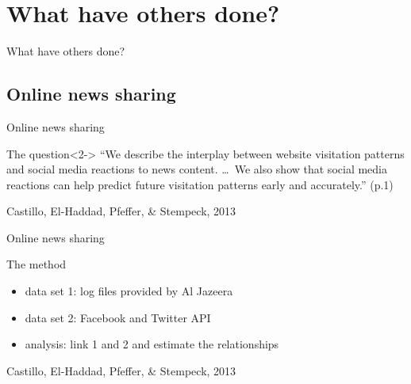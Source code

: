 \documentclass{beamer}
\begin{document}
\section{What have others done?}
\begin{frame}
What have others done?
\end{frame}

\subsection{Online news sharing}
\begin{frame}{Online news sharing}
\begin{block}{The question}<2->
``We describe the interplay between website visitation patterns and social media reactions to news content. \lbrack\ldots\rbrack ~We also show  that social media reactions can help predict future visitation patterns early and accurately.'' (p.1)
\end{block}
\footnotesize{Castillo, El-Haddad, Pfeffer, \& Stempeck, 2013}
\end{frame}

\begin{frame}{Online news sharing}
\begin{block}{The method}
\begin{itemize}
\item data set 1: log files provided by Al Jazeera
\item data set 2: Facebook and Twitter API
\item analysis: link 1 and 2 and estimate the relationships  
\end{itemize}
\end{block}
\footnotesize{Castillo, El-Haddad, Pfeffer, \& Stempeck, 2013}
\end{frame}


{
\begin{frame}[plain]
\end{frame}
}
\end{document}
